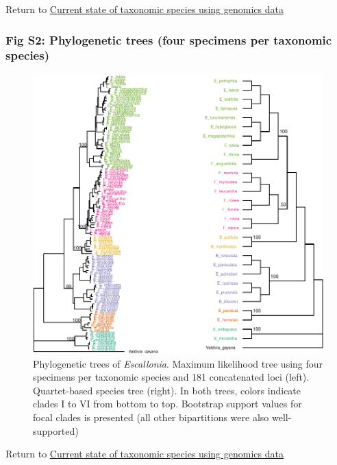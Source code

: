 \documentclass[
  11pt,
]{article}
\begin{document}
Return to \protect\hyperlink{current-state-of-taxonomic-species-using-genomics-data}{Current state of taxonomic species using genomics data}
\pagebreak

\hypertarget{fig-s2-phylogenetic-trees-four-specimens-per-taxonomic-species}{%
\subsubsection{Fig S2: Phylogenetic trees (four specimens per taxonomic species)}\label{fig-s2-phylogenetic-trees-four-specimens-per-taxonomic-species}}

\begin{figure}
\includegraphics{Supplementary_Material_files/figure-latex/EscalloniaSpeciesTreeVersion2Plot-1} \caption{Phylogenetic trees of \textit{Escallonia}. Maximum likelihood tree using four specimens per taxonomic species and 181 concatenated loci (left). Quartet-based species tree (right). In both trees, colors indicate clades I to VI from bottom to top. Bootstrap support values for focal clades is presented (all other bipartitions were also well-supported)}\label{fig:EscalloniaSpeciesTreeVersion2Plot}
\end{figure}

Return to \protect\hyperlink{current-state-of-taxonomic-species-using-genomics-data}{Current state of taxonomic species using genomics data}
\pagebreak
\end{document}
